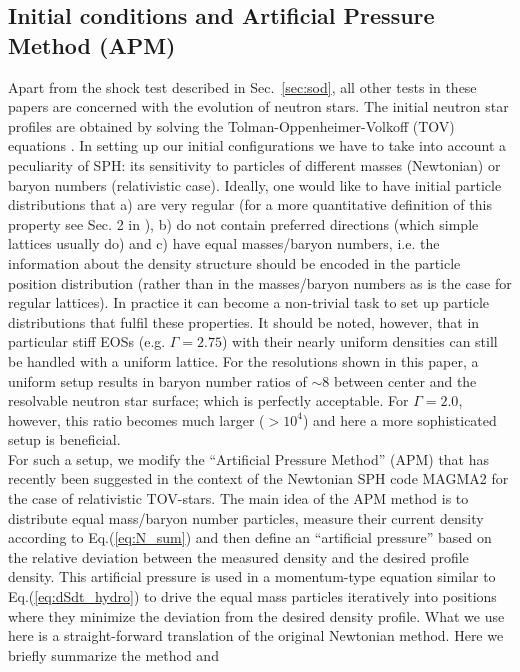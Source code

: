 \documentclass[useAMS,usenatbib]{iopart}
\begin{document}
\subsection{Initial conditions and Artificial Pressure Method (APM)}
\label{sec:APM}
Apart from the shock test described in Sec.~\ref{sec:sod}, all other tests in these papers
are concerned with the evolution of neutron stars. The initial neutron star profiles are obtained by
solving the Tolman-Oppenheimer-Volkoff (TOV) equations \cite{tolman39,oppenheimer39}. In 
setting up our initial configurations we have to take into account a peculiarity of SPH: its sensitivity
to particles of different masses (Newtonian) or baryon numbers (relativistic case). Ideally, one would
like to have initial particle distributions that a) are very regular (for a more quantitative definition of
this property see Sec. 2 in \cite{rosswog15c}), b) do not contain preferred directions (which simple
lattices usually do) and c) have equal masses/baryon numbers, i.e. the information about the density
structure should be encoded in the particle position distribution (rather than in the masses/baryon numbers
as is the case for regular lattices). In practice it can become a non-trivial task to set up particle distributions
that fulfil these properties. It should be noted, however, that in particular stiff EOSs (e.g. $\Gamma=2.75$) 
with their nearly uniform densities can still be handled with a uniform lattice. For the resolutions
shown in this paper, a uniform setup results in baryon number ratios of $\sim 8$ between center 
and the resolvable neutron star surface; which is perfectly acceptable. 
For $\Gamma=2.0$, however, this ratio becomes much larger ($>10^4$) and here a more sophisticated 
setup is beneficial.\\
For such a setup,  we modify the ``Artificial Pressure Method'' (APM) that has recently been suggested in the context
of the  Newtonian SPH code MAGMA2 \cite{rosswog20a} for the case of relativistic TOV-stars.
The main idea of the APM method is to distribute equal mass/baryon number particles, measure their
current density according to Eq.(\ref{eq:N_sum}) and then define an ``artificial pressure'' based on
the relative deviation  between the measured density  and the desired profile density. This artificial pressure
is used in a momentum-type equation similar to Eq.(\ref{eq:dSdt_hydro}) to drive the equal mass particles iteratively 
into positions where they minimize the deviation from the desired density profile. What we use here is a
straight-forward translation of the original Newtonian method. Here we briefly summarize the method and
\end{document}
